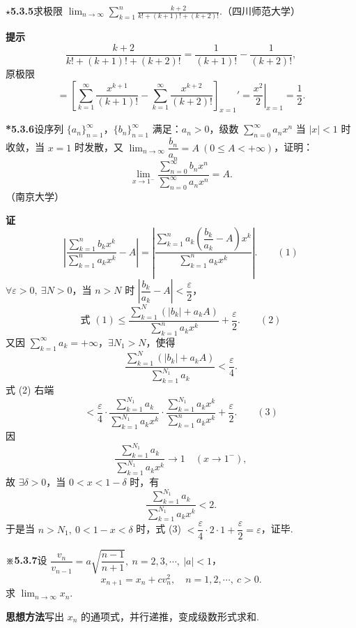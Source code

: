 \documentclass[UTF8, 12pt, fontset=fandol, oneside]{ctexart}
\begin{document}
\noindent\textbf{\(\star\)5.3.5}\quad 求极限 $\displaystyle\lim_{n\to\infty}\sum_{k=1}^n\frac{k+2}{k!+(k+1)!+(k+2)!}$.（四川师范大学）

\noindent\textbf{提示}\quad
\[
  \frac{k+2}{k!+(k+1)!+(k+2)!}
  =\frac1{(k+1)!}-\frac1{(k+2)!},
\]
原极限
\[
  =\left[\sum_{k=1}^{\infty}\frac{x^{k+1}}{(k+1)!}
  -\sum_{k=1}^{\infty}\frac{x^{k+2}}{(k+2)!}\right]_{x=1}'
  =\left.\frac{x^2}{2}\right|_{x=1}
  =\frac12.
\]

\noindent\textbf{*5.3.6}\quad 设序列 $\{a_n\}_{n=1}^{\infty}$，$\{b_n\}_{n=1}^{\infty}$ 满足：$a_n>0$，级数 $\displaystyle\sum_{n=0}^{\infty}a_nx^n$ 当 $|x|<1$ 时收敛，当 $x=1$ 时发散，又 $\displaystyle\lim_{n\to\infty}\dfrac{b_n}{a_n}=A\ (0\le A<+\infty)$，证明：
\[
  \lim_{x\to1^-}\frac{\displaystyle\sum_{n=0}^{\infty}b_nx^n}
  {\displaystyle\sum_{n=0}^{\infty}a_nx^n}=A.
\]
（南京大学）

\noindent\textbf{证}\quad
\[
  \left|\frac{\displaystyle\sum_{k=1}^n b_kx^k}{\displaystyle\sum_{k=1}^n a_kx^k}-A\right|
  =
  \left|\frac{\displaystyle\sum_{k=1}^n a_k\left(\dfrac{b_k}{a_k}-A\right)x^k}
  {\displaystyle\sum_{k=1}^n a_kx^k}\right|. \qquad(1)
\]
$\forall\varepsilon>0,\ \exists N>0$，当 $n>N$ 时 $\left|\dfrac{b_k}{a_k}-A\right|<\dfrac\varepsilon2$，
\[
  \text{式 }(1)\le
  \frac{\displaystyle\sum_{k=1}^N(|b_k|+a_kA)}
  {\displaystyle\sum_{k=1}^n a_kx^k}
  +\frac\varepsilon2. \qquad(2)
\]
又因 $\displaystyle\sum_{k=1}^{\infty}a_k=+\infty$，$\exists N_1>N$，使得
\[
  \frac{\displaystyle\sum_{k=1}^{N}(|b_k|+a_kA)}
  {\displaystyle\sum_{k=1}^{N_1}a_k}<\frac\varepsilon4.
\]
式 (2) 右端
\[
  <\frac\varepsilon4\cdot
  \frac{\displaystyle\sum_{k=1}^{N_1}a_k}{\displaystyle\sum_{k=1}^{N_1}a_kx^k}\cdot
  \frac{\displaystyle\sum_{k=1}^{N_1}a_kx^k}{\displaystyle\sum_{k=1}^{n}a_kx^k}
  +\frac\varepsilon2. \qquad(3)
\]
因
\[
  \frac{\displaystyle\sum_{k=1}^{N_1}a_k}
  {\displaystyle\sum_{k=1}^{N_1}a_kx^k}\to1\quad(x\to1^-),
\]
故 $\exists\delta>0$，当 $0<x<1-\delta$ 时，有
\[
  \frac{\displaystyle\sum_{k=1}^{N_1}a_k}
  {\displaystyle\sum_{k=1}^{N_1}a_kx^k}<2.
\]
于是当 $n>N_1,\ 0<1-x<\delta$ 时，式 (3)
$<\dfrac\varepsilon4\cdot2\cdot1+\dfrac\varepsilon2=\varepsilon$，证毕.

\noindent\textbf{※5.3.7}\quad 设 $\dfrac{v_n}{v_{n-1}}=a\sqrt{\dfrac{n-1}{n+1}},\ n=2,3,\cdots,\ |a|<1$，
\[
  x_{n+1}=x_n+cv_n^2,\quad n=1,2,\cdots,\ c>0.
\]
求 $\displaystyle\lim_{n\to\infty}x_n$.

\noindent\textbf{思想方法}\quad 写出 $x_n$ 的通项式，并行递推，变成级数形式求和.
\end{document}
